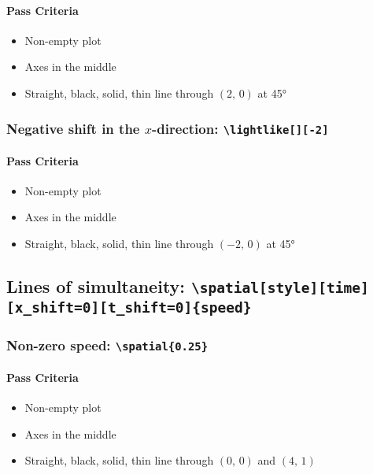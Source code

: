 \documentclass[pagesize,headsepline,parskip=half]{scrartcl}
\begin{document}
            \paragraph{Pass Criteria}
              \begin{itemize}
                \item Non-empty plot
                \item Axes in the middle
                \item Straight, black, solid, thin line through $(2, \, 0)$ at 45°
              \end{itemize}

          \subsubsection{Negative shift in the $x$-direction: \texttt{\textbackslash{}lightlike[][-2]}}
            \begin{spacetimediagram}
              \lightlike[][-2]
            \end{spacetimediagram}

            \paragraph{Pass Criteria}
              \begin{itemize}
                \item Non-empty plot
                \item Axes in the middle
                \item Straight, black, solid, thin line through $(-2, \, 0)$ at 45°
              \end{itemize}

        \subsection{Lines of simultaneity: \texttt{\textbackslash{}spatial[style][time][x\_shift=0][t\_shift=0]\{speed\}}}
          \subsubsection{Non-zero speed: \texttt{\textbackslash{}spatial\{0.25\}}}
            \begin{spacetimediagram}[grid, ymax=4]
            \end{spacetimediagram}

            \paragraph{Pass Criteria}
              \begin{itemize}
                \item Non-empty plot
                \item Axes in the middle
                \item Straight, black, solid, thin line through $(0, \, 0)$ and $(4, \, 1)$
              \end{itemize}
\end{document}
